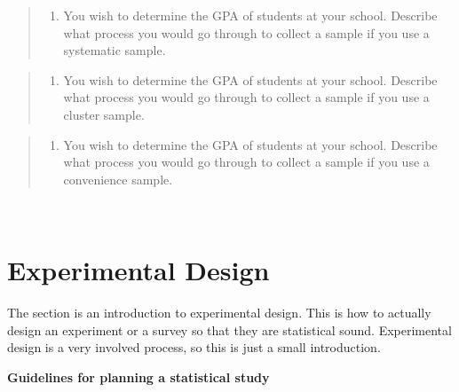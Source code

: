 \documentclass[]{book}
\providecommand{\tightlist}{%
  \setlength{\itemsep}{0pt}\setlength{\parskip}{0pt}}
\begin{document}
\begin{quote}
\begin{enumerate}
\def\labelenumi{\arabic{enumi}.}
\setcounter{enumi}{4}
\tightlist
\item
  You wish to determine the GPA of students at your school. Describe what process you would go through to collect a sample if you use a systematic sample.
\end{enumerate}
\end{quote}

\begin{quote}
\begin{enumerate}
\def\labelenumi{\arabic{enumi}.}
\setcounter{enumi}{5}
\tightlist
\item
  You wish to determine the GPA of students at your school. Describe what process you would go through to collect a sample if you use a cluster sample.
\end{enumerate}
\end{quote}

\begin{quote}
\begin{enumerate}
\def\labelenumi{\arabic{enumi}.}
\setcounter{enumi}{6}
\tightlist
\item
  You wish to determine the GPA of students at your school. Describe what process you would go through to collect a sample if you use a convenience sample.
\end{enumerate}
\end{quote}

\textbf{\\
}

\hypertarget{experimental-design}{%
\section{Experimental Design}\label{experimental-design}}

The section is an introduction to experimental design. This is how to actually design an experiment or a survey so that they are statistical sound. Experimental design is a very involved process, so this is just a small introduction.

\textbf{Guidelines for planning a statistical study}
\end{document}
